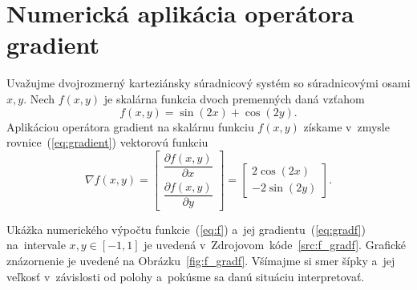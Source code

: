 \documentclass[a4paper, 12pt]{book}
\begin{document}

\appendix
\chapter{Numerická aplikácia operátora gradient}
\label{app:numerical_application_of_gradient}

Uvažujme dvojrozmerný karteziánsky súradnicový systém so súradnicovými osami 
$x, y$.  Nech $f(x, y)$ je skalárna funkcia dvoch premenných daná vzťahom
%
\begin{equation}
\label{eq:f}
f(x, y) = \sin(2x) + \cos(2y){.}
\end{equation}
%
Aplikáciou operátora gradient na skalárnu funkciu $f(x, y)$ získame v~zmysle
rovnice~(\ref{eq:gradient}) vektorovú funkciu
%
\begin{equation}
\label{eq:gradf}
\nabla f(x, y) =
\begin{bmatrix}
\dfrac{\partial f(x, y)}{\partial x} \\[2ex]
\dfrac{\partial f(x, y)}{\partial y}
\end{bmatrix}
=
\begin{bmatrix}
2 \cos(2x) \\[2ex]
-2 \sin(2y)
\end{bmatrix}
{.}
\end{equation}

Ukážka numerického výpočtu funkcie~(\ref{eq:f}) a~jej 
gradientu~(\ref{eq:gradf}) na~intervale $x, y \in [-1, 1]$ je uvedená 
v~Zdrojovom~kóde~\ref{src:f_gradf}.  Grafické znázornenie je uvedené na 
Obrázku~\ref{fig:f_gradf}.  Všímajme si smer šípky a~jej veľkosť v~závislosti 
od polohy a~pokúsme sa danú situáciu interpretovať.

\vspace{2ex}


\end{document}
